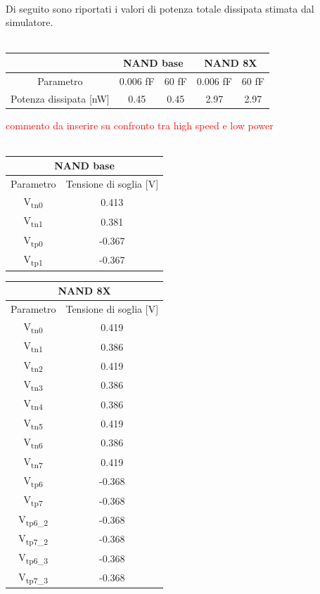 \documentclass[11pt,  english, makeidx, a4paper, titlepage, oneside]{book}
\begin{document}
\\
Di seguito sono riportati i valori di potenza totale dissipata stimata dal simulatore.
\\\\
\begin{center}
	\begin{tabular}{|c|c|c||c|c|}
	\hline
	& \multicolumn{2}{c}{NAND base} & \multicolumn{2}{c}{NAND 8X}\\
	\hline
	Parametro & 0.006 fF & 60 fF & 0.006 fF & 60 fF \\
	\hline
	Potenza dissipata [nW] & 0.45 & 0.45 & 2.97 & 2.97\\
	\hline
	\end{tabular}	
\end{center}
\vspace{0.3cm}
\textcolor{red}{commento da inserire su confronto tra high speed e low power}
\\\\
\begin{center}
	\begin{tabular}{|c|c|}
	\hline
	 \multicolumn{2}{c}{NAND base} \\
	\hline
	Parametro & Tensione di soglia [V] \\
	\hline
	 V\textsubscript{tn0} & 0.413\\
	\hline
	 V\textsubscript{tn1} & 0.381 \\
	\hline
	V\textsubscript{tp0} & -0.367 \\
	\hline
	V\textsubscript{tp1} & -0.367 \\
	\hline
	\end{tabular}	
	\begin{tabular}{|c|c|}
	\hline
	 \multicolumn{2}{c}{NAND 8X} \\
	\hline
	Parametro & Tensione di soglia [V] \\
	\hline
	 V\textsubscript{tn0} & 0.419\\
	\hline
	 V\textsubscript{tn1} & 0.386 \\
	 \hline
	 V\textsubscript{tn2} & 0.419 \\
	 \hline
	 V\textsubscript{tn3} & 0.386 \\
	 \hline
	 V\textsubscript{tn4} & 0.386 \\
	 \hline
	 V\textsubscript{tn5} & 0.419 \\
	 \hline
	 V\textsubscript{tn6} & 0.386 \\
	\hline
	 V\textsubscript{tn7} & 0.419 \\
	 \hline
	V\textsubscript{tp6} & -0.368 \\
	\hline
	V\textsubscript{tp7} & -0.368 \\
	\hline
	V\textsubscript{tp6\_2} & -0.368 \\
	\hline
	V\textsubscript{tp7\_2} & -0.368 \\
	\hline
	V\textsubscript{tp6\_3} & -0.368 \\
	\hline
	V\textsubscript{tp7\_3} & -0.368 \\
	\hline
	\end{tabular}	
\end{center}
\end{document}
